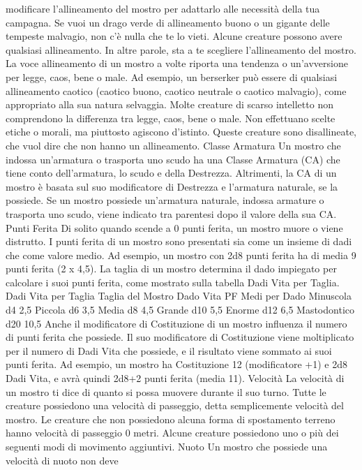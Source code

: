 \begin{multicols}{2}
modificare l’allineamento del mostro per adattarlo alle
necessità della tua campagna. Se vuoi un drago verde
di allineamento buono o un gigante delle tempeste
malvagio, non c’è nulla che te lo vieti.
Alcune creature possono avere qualsiasi
allineamento. In altre parole, sta a te scegliere
l’allineamento del mostro. La voce allineamento di un
mostro a volte riporta una tendenza o un’avversione per
legge, caos, bene o male. Ad esempio, un berserker
può essere di qualsiasi allineamento caotico (caotico
buono, caotico neutrale o caotico malvagio), come
appropriato alla sua natura selvaggia.
Molte creature di scarso intelletto non comprendono la
differenza tra legge, caos, bene o male. Non effettuano
scelte etiche o morali, ma piuttosto agiscono d’istinto.
Queste creature sono disallineate, che vuol dire che
non hanno un allineamento.
Classe Armatura
Un mostro che indossa un’armatura o trasporta uno
scudo ha una Classe Armatura (CA) che tiene conto
dell’armatura, lo scudo e della Destrezza. Altrimenti, la
CA di un mostro è basata sul suo modificatore di
Destrezza e l’armatura naturale, se la possiede. Se un
mostro possiede un’armatura naturale, indossa
armature o trasporta uno scudo, viene indicato tra
parentesi dopo il valore della sua CA.
Punti Ferita
Di solito quando scende a 0 punti ferita, un mostro
muore o viene distrutto.
I punti ferita di un mostro sono presentati sia come un
insieme di dadi che come valore medio. Ad esempio,
un mostro con 2d8 punti ferita ha di media 9 punti ferita
(2 x 4,5).
La taglia di un mostro determina il dado impiegato per
calcolare i suoi punti ferita, come mostrato sulla tabella
Dadi Vita per Taglia.
Dadi Vita per Taglia
Taglia del Mostro Dado Vita PF Medi per Dado
Minuscola d4 2,5
Piccola d6 3,5
Media d8 4,5
Grande d10 5,5
Enorme d12 6,5
Mastodontico d20 10,5
Anche il modificatore di Costituzione di un mostro
influenza il numero di punti ferita che possiede. Il suo
modificatore di Costituzione viene moltiplicato per il
numero di Dadi Vita che possiede, e il risultato viene
sommato ai suoi punti ferita. Ad esempio, un mostro ha
Costituzione 12 (modificatore +1) e 2d8 Dadi Vita, e
avrà quindi 2d8+2 punti ferita (media 11).
Velocità
La velocità di un mostro ti dice di quanto si possa
muovere durante il suo turno.
Tutte le creature possiedono una velocità di passeggio,
detta semplicemente velocità del mostro. Le creature
che non possiedono alcuna forma di spostamento
terreno hanno velocità di passeggio 0 metri.
Alcune creature possiedono uno o più dei seguenti
modi di movimento aggiuntivi.
Nuoto
Un mostro che possiede una velocità di nuoto non deve

\end{multicols}
